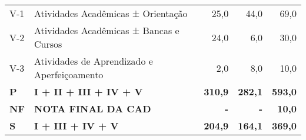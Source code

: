 \documentclass[11pt,a4paper]{article}
\begin{document}
\begin{table}[ht]
{\begin{tabular}{|l|l|r|r|r|}
  V-1 & Atividades Acadêmicas ± Orientação & 25,0 & 44,0 & 69,0 \\ 
  V-2 & Atividades Acadêmicas ± Bancas e Cursos & 24,0 & 6,0 & 30,0 \\ 
  V-3 & Atividades de Aprendizado e Aperfeiçoamento & 2,0 & 8,0 & 10,0 \\ 
  \textbf{P} & \textbf{I + II + III + IV + V} & \textbf{310,9} & \textbf{282,1} & \textbf{593,0} \\ 
  \textbf{NF} & \textbf{NOTA FINAL DA CAD} & \textbf{-} & \textbf{-} & \textbf{10,0} \\ 
  \textbf{S} & \textbf{I + III + IV + V} & \textbf{204,9} & \textbf{164,1} & \textbf{369,0} \\ 
   \hline
\end{tabular}
}
\end{table}
\end{document}
